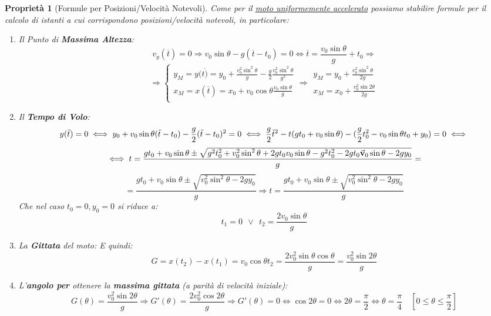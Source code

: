 \documentclass{article}
\newtheorem{property}{Proprietà}[section]
\newcommand{\then}{\ensuremath{\Rightarrow}}
\renewcommand{\v}{\va{v}}
\begin{document}
\begin{property}[Formule per Posizioni/Velocità Notevoli]
Come per il \hyperlink{formulemotounifacc}{moto uniformemente accelerato} possiamo stabilire formule per il calcolo di istanti a cui corrispondono posizioni/velocità notevoli, in particolare:
\begin{enumerate}
    \item Il Punto di \textbf{Massima Altezza}:
    \[v_y(\overline{t})=0\then v_0\sin\theta-g(\overline{t}-t_0)=0\iff \overline{t}=\frac{v_0\sin\theta}{g}+t_0\then\]\[\then \left\{\begin{array}{l}
        y_M=y(\overline{t)}=y_0+\frac{v_0^2\sin^2\theta}{g}-\frac{g}{2}\frac{v_0^2\sin^2\theta}{g^2}  \\
        x_M=x(\overline{t})=x_0+v_0\cos\theta\frac{v_0\sin\theta}{g}  \\
    \end{array}\right.\then\boxed{\begin{array}{l}
        y_M=y_0+\frac{v_0^2\sin^2\theta}{2g}  \\
        x_M=x_0+\frac{v_0^2\sin2\theta}{2g}  \\
    \end{array}}\]
    \item Il \textbf{Tempo di Volo}:
    \[y(\Tilde{t})=0\iff y_0+v_0\sin\theta(\tilde{t}-t_0)-\frac{g}{2}(\tilde{t}-t_0)^2=0\iff \frac{g}{2}\tilde{t}^2-t(gt_0+v_0\sin\theta)-(\frac{g}{2}t_0^2-v_0\sin\theta t_0+y_0)=0\iff \]\[\iff t=\frac{gt_0+v_0\sin\theta\pm\sqrt{g^2t_0^2+v_0^2\sin^2\theta+2gt_0v_0\sin\theta-g^2t_0^2-2gt_0\v_0\sin\theta-2gy_0}}{g}=\]\[=\frac{gt_0+v_0\sin\theta\pm\sqrt{v_0^2\sin^2\theta-2gy_0}}{g}\then \boxed{t=\frac{gt_0+v_0\sin\theta\pm\sqrt{v_0^2\sin^2\theta-2gy_0}}{g}}\]
    Che nel caso $t_0=0,y_0=0$ si riduce a:
    \[\boxed{t_1=0\;\,\vee \;\,t_2=\frac{2v_0\sin\theta}{g}}\]
    \item La \textbf{Gittata} del moto:
    E quindi:
    \[G=x(t_2)-x(t_1)=v_0\cos\theta t_2=\frac{2v_0^2\sin\theta\cos\theta}{g}=\frac{v_0^2\sin2\theta}{g}\]
    \item L'\textbf{angolo per} ottenere la \textbf{massima gittata} (a parità di velocità iniziale):
    \[G(\theta)=\frac{v_0^2\sin2\theta}{g}\then G'(\theta)=\frac{2v_0^2\cos2\theta}{g}\then G'(\theta)=0\iff \cos2\theta=0\iff 2\theta=\frac{\pi}{2}\iff \theta=\frac{\pi}{4}\quad \left[0\leq\theta\leq \frac{\pi}{2}\right]\]
\end{enumerate}
\end{property}
\end{document}
